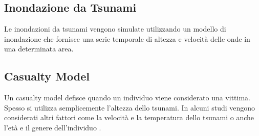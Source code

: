 \subsection{Inondazione da Tsunami}
Le inondazioni da tsunami vengono simulate utilizzando un modello di inondazione
che fornisce una serie temporale di altezza e velocità delle onde in una determinata area.

\subsection{Casualty Model}
Un casualty model defisce quando un individuo viene considerato una vittima.
Spesso si utilizza semplicemente l'altezza dello tsunami.
In alcuni studi vengono considerati altri fattori come la velocità
e la temperatura dello tsunami o anche l'età e il genere dell'individuo \parencite{yeh2010gender}.

